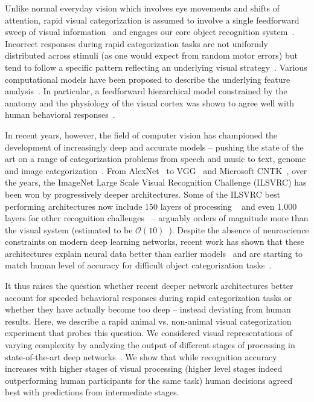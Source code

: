 \documentclass{article}
\begin{document}
\enlargethispage{5mm}

Unlike normal everyday vision which involves eye movements and shifts of attention, rapid visual categorization is assumed to involve a single feedforward sweep of visual information~\citep[see][for review]{VanRullen2007} and engages our core object recognition system~\citep[reviewed in][]{DiCarlo2012}. Incorrect responses during rapid categorization tasks are not uniformly distributed across stimuli (as one would expect from random motor errors) but tend to follow a specific pattern reflecting an underlying visual strategy~\citep{Cauchoix2016}. Various computational models have been proposed to describe the underlying feature analysis~\citep[see][for review]{Crouzet2011}. In particular, a feedforward hierarchical model constrained by the anatomy and the physiology of the visual cortex was shown to agree well with human behavioral responses~\citep{Serre2007}. 
 
In recent years, however, the field of computer vision has championed the development of increasingly deep and accurate models -- pushing the state of the art on a range of categorization problems from speech and music to text, genome and image categorization~\citep[see][for a recent review]{LeCun2015}. From AlexNet~\citep{Krizhevsky2012} to VGG~\citep{Simonyan2014a} and Microsoft CNTK~\citep{He2015a}, over the years, the ImageNet Large Scale Visual Recognition Challenge (ILSVRC) has been won by progressively deeper architectures. Some of the ILSVRC best performing architectures now include 150 layers of processing ~\citep{He2015a} and even 1,000 layers for other recognition challenges~\citep{HeZR016} -- arguably orders of magnitude more than the visual system (estimated to be $\mathcal O(10)$~\citep{Serre2007}). Despite the absence of neuroscience constraints on modern deep learning networks, recent work has shown that these architectures explain neural data better than earlier models~\citep[reviewed in][]{Yamins2016} and are starting to match human level of accuracy for difficult object categorization tasks~\citep{He2015a}. 

It thus raises the question whether recent deeper network architectures better account for speeded behavioral responses during rapid categorization tasks or whether they have actually become too deep -- instead deviating from human results. Here, we describe a rapid animal vs. non-animal visual categorization experiment that probes this question. We considered visual representations of varying complexity by analyzing the output of different stages of processing in state-of-the-art deep networks~\citep{Krizhevsky2012, Simonyan2014a}. We show that while recognition accuracy increases with higher stages of visual processing (higher level stages indeed outperforming human participants for the same task) human decisions agreed best with predictions from intermediate stages. 
\end{document}
